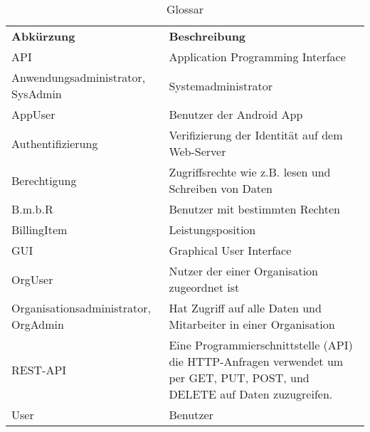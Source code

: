 
\begin{table}[h]
	\centering
	\begin{tabularx}{\textwidth}{X X}
		\rowcolor[HTML]{C0C0C0} 
		\textbf{Abkürzung} & \textbf{Beschreibung} \\
		API & Application Programming Interface\\

		\rowcolor[HTML]{E7E7E7} 
		Anwendungsadministrator, SysAdmin & Systemadministrator \\
		AppUser & Benutzer der Android App \\

		\rowcolor[HTML]{E7E7E7} 		
		Authentifizierung & Verifizierung der Identität auf dem Web-Server \\
		Berechtigung & Zugriffsrechte wie z.B. lesen und Schreiben von Daten \\
		\rowcolor[HTML]{E7E7E7} 
		B.m.b.R & Benutzer mit bestimmten Rechten \\
		BillingItem & Leistungsposition \\
				\rowcolor[HTML]{E7E7E7} 
		GUI & Graphical User Interface \\



		OrgUser & Nutzer der einer Organisation zugeordnet ist \\
		\rowcolor[HTML]{E7E7E7} 
		Organisationsadministrator, OrgAdmin & Hat Zugriff auf alle Daten und Mitarbeiter in einer Organisation \\
		

		REST-API & Eine Programmierschnittstelle (API) die HTTP-Anfragen verwendet um per GET, PUT, POST, und DELETE auf Daten zuzugreifen.\\
		\rowcolor[HTML]{E7E7E7} 
		User & Benutzer \\
		


	\end{tabularx}
	\caption{Glossar}
	\label{table:glossar}
\end{table}